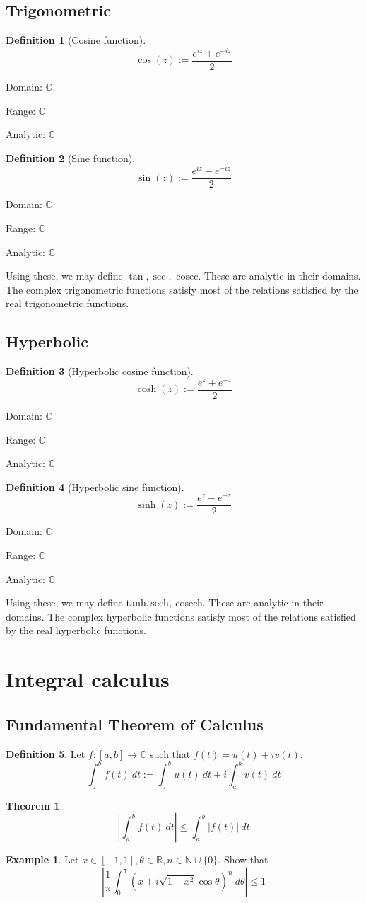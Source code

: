 \documentclass[10pt, a4paper]{extarticle}
\theoremstyle{definition}
\newtheorem{thm}{Theorem}
\newtheorem{defn}{Definition}
\newtheorem{eg}{Example}
\begin{document}
\subsection{Trigonometric}
\begin{defn}[Cosine function]\label{complexcos}
	\[\cos(z):=\frac{e^{iz}+e^{-iz}}{2}\]

	Domain: $\mathbb{C}$

	Range: $\mathbb{C}$

	Analytic: $\mathbb{C}$
\end{defn}
\begin{defn}[Sine function]
	\[\sin(z):=\frac{e^{iz}-e^{-iz}}{2}\]

	Domain: $\mathbb{C}$

	Range: $\mathbb{C}$

	Analytic: $\mathbb{C}$
\end{defn}
Using these, we may define $\tan,\sec,$ cosec. These are analytic in their domains. The complex trigonometric functions satisfy most of the relations satisfied by the real trigonometric functions.

\subsection{Hyperbolic}
\begin{defn}[Hyperbolic cosine function]
	\[\cosh(z):=\frac{e^{z}+e^{-z}}{2}\]

	Domain: $\mathbb{C}$

	Range: $\mathbb{C}$

	Analytic: $\mathbb{C}$
\end{defn}
\begin{defn}[Hyperbolic sine function]
	\[\sinh(z):=\frac{e^{z}-e^{-z}}{2}\]

	Domain: $\mathbb{C}$

	Range: $\mathbb{C}$

	Analytic: $\mathbb{C}$
\end{defn}
Using these, we may define $\tanh,\sech,$ cosech. These are analytic in their domains. The complex hyperbolic functions satisfy most of the relations satisfied by the real hyperbolic functions.

\section{Integral calculus}
\subsection{Fundamental Theorem of Calculus}
\begin{defn}
	Let $f:[a,b]\to\mathbb{C}$ such that $f(t)=u(t)+iv(t)$.
	\[\int_{a}^bf(t)\ dt:=\int_a^bu(t)\ dt+i\int_a^bv(t)\ dt\]
\end{defn}
\begin{thm}
	\[\left|\int_{a}^bf(t)\ dt\right|\leq\int_{a}^b|f(t)|\ dt\]
\end{thm}
\begin{eg}
	Let $x\in[-1,1],\theta\in\mathbb{R}, n\in\mathbb{N}\cup\{0\}$. Show that
	\[\left|\frac{1}{\pi}\int_0^\pi (x+i\sqrt{1-x^2}\cos\theta)^n\ d\theta\right|\leq 1\]
\end{eg}
\end{document}
